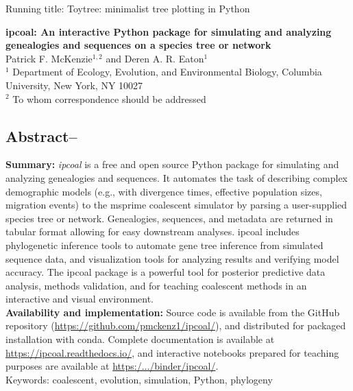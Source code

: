 \documentclass[11pt]{article}
\begin{document}
\noindent Running title: Toytree: minimalist tree plotting in Python\\

\begin{center}
{\bf \Large 
ipcoal: An interactive Python package for simulating and analyzing genealogies and sequences on a species tree or network
}\\[0.25cm]

Patrick F. McKenzie$^{1, 2}$ and Deren A. R. Eaton$^{1}$\\[0.25cm]

$^{1}$ Department of Ecology, Evolution, and Environmental Biology, Columbia University, New York, NY 10027 \\
$^{2}$ To whom correspondence should be addressed

\end{center}
\noindent

\subsection*{Abstract--}
\textbf{Summary:} \emph{ipcoal} is a free and open source Python package for simulating and analyzing genealogies and sequences. It automates the task of describing complex demographic models (e.g., with divergence times, effective population sizes, migration events) to the msprime coalescent simulator by parsing a user-supplied species tree or network. Genealogies, sequences, and metadata are returned in tabular format allowing for easy downstream analyses. ipcoal includes phylogenetic inference tools to automate gene tree inference from simulated sequence data, and visualization tools for analyzing results and verifying model accuracy. The ipcoal package is a powerful tool for posterior predictive data analysis, methods validation, and for teaching coalescent methods in an interactive and visual environment. \\

\noindent \textbf{Availability and implementation:} Source code is available from the GitHub repository (\url{https://github.com/pmckenz1/ipcoal/}), and distributed for packaged installation with conda. Complete documentation is available at \url{https://ipcoal.readthedocs.io/}, and interactive notebooks prepared for teaching purposes are available at \url{https:/.../binder/ipcoal/}.\\

\noindent Keywords: coalescent, evolution, simulation, Python, phylogeny
\end{document}
